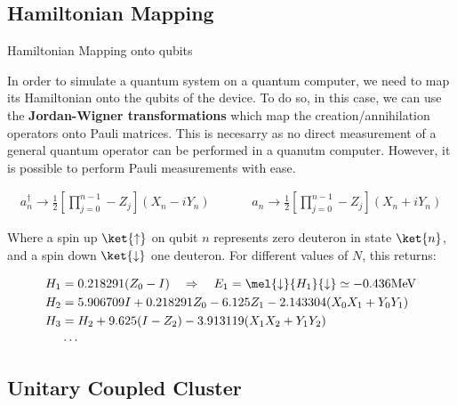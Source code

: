 \documentclass[9pt, handout, aspectratio=169]{beamer}		%
\begin{document}

	\subsection{Hamiltonian Mapping}

	\begin{frame}{Hamiltonian Mapping onto qubits}

		In order to simulate a quantum system on a quantum computer, we need to map its Hamiltonian onto the qubits of the device. To do so, in this case, we can use the \textbf{Jordan-Wigner transformations} which map the creation/annihilation operators onto Pauli matrices. This is necesarry as no direct measurement of a general quantum operator can be performed in a quanutm computer. However, it is possible to perform Pauli measurements with ease.

		\begin{align*}
			a^{\dagger}_{n} \rightarrow \frac{1}{2} \left[ \prod^{n-1}_{j=0} -Z_j \right] (X_n - i Y_n)
			\hspace{40pt}
			a_{n} \rightarrow \frac{1}{2} \left[ \prod^{n-1}_{j=0} -Z_j \right] (X_n + i Y_n)
		\end{align*}

		Where a spin up $\ket{\uparrow}$ on qubit $n$ represents zero deuteron in state $\ket{n}$, and a spin down $\ket{\downarrow}$ one deuteron. For different values of $N$, this returns:

		\begin{align*}
			H_1 &= 0.218291(Z_0 - I) \quad \Rightarrow \quad E_1 = \mel{\downarrow}{H_1}{\downarrow} \simeq -0.436 \text{MeV} \\
			H_2 &= 5.906709 I + 0.218291 Z_0 - 6.125 Z_1 - 2.143304(X_0 X_1 + Y_0 Y_1) \\
			H_3 &= H_2 + 9.625(I-Z_2) - 3.913119(X_1 X_2 + Y_1 Y_2) \\
			&\cdots
		\end{align*}

		\vspace{-20pt}

	\end{frame}


	\subsection{Unitary Coupled Cluster}
\end{document}
